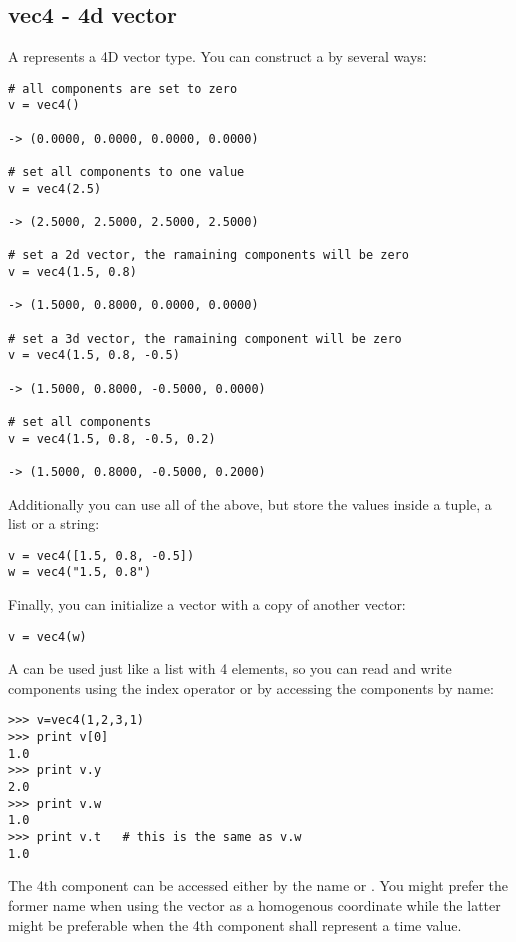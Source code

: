 \subsection{vec4 - 4d vector}
\label{vec4}

A  represents a 4D vector type. You can construct a 
by several ways:

\begin{verbatim}
# all components are set to zero
v = vec4()

-> (0.0000, 0.0000, 0.0000, 0.0000)

# set all components to one value
v = vec4(2.5)

-> (2.5000, 2.5000, 2.5000, 2.5000)

# set a 2d vector, the ramaining components will be zero
v = vec4(1.5, 0.8)

-> (1.5000, 0.8000, 0.0000, 0.0000)

# set a 3d vector, the ramaining component will be zero
v = vec4(1.5, 0.8, -0.5)

-> (1.5000, 0.8000, -0.5000, 0.0000)

# set all components
v = vec4(1.5, 0.8, -0.5, 0.2)

-> (1.5000, 0.8000, -0.5000, 0.2000)
\end{verbatim}

Additionally you can use all of the above, but store the values inside
a tuple, a list or a string:

\begin{verbatim}
v = vec4([1.5, 0.8, -0.5])
w = vec4("1.5, 0.8")
\end{verbatim}

Finally, you can initialize a vector with a copy of another vector:

\begin{verbatim}
v = vec4(w)
\end{verbatim}

A  can be used just like a list with 4 elements, so you
can read and write components using the index operator or by accessing
the components by name:

\begin{verbatim}
>>> v=vec4(1,2,3,1)
>>> print v[0]
1.0
>>> print v.y
2.0
>>> print v.w
1.0
>>> print v.t   # this is the same as v.w
1.0
\end{verbatim}

The 4th component can be accessed either by the name  or
. You might prefer the former name when using the vector as a
homogenous coordinate while the latter might be preferable when the
4th component shall represent a time value.


